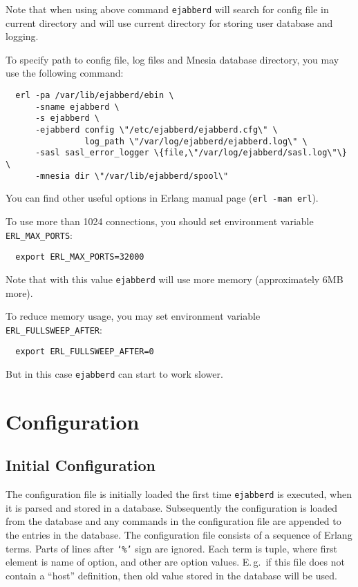 \documentclass[a4paper,10pt]{article}
\newcommand{\term}[1]{\texttt{#1}}
\newcommand{\shell}[1]{\texttt{#1}}
\newcommand{\ejabberd}{\texttt{ejabberd}}
\begin{document}
Note that when using above command \ejabberd{} will search for config file
in current directory and will use current directory for storing user database
and logging.

To specify path to config file, log files and Mnesia database directory,
you may use the following command:
\begin{verbatim}
  erl -pa /var/lib/ejabberd/ebin \
      -sname ejabberd \
      -s ejabberd \
      -ejabberd config \"/etc/ejabberd/ejabberd.cfg\" \
                log_path \"/var/log/ejabberd/ejabberd.log\" \
      -sasl sasl_error_logger \{file,\"/var/log/ejabberd/sasl.log\"\} \
      -mnesia dir \"/var/lib/ejabberd/spool\"
\end{verbatim}

You can find other useful options in Erlang manual page (\shell{erl -man erl}).

To use more than 1024 connections, you should set environment variable
\verb|ERL_MAX_PORTS|:
\begin{verbatim}
  export ERL_MAX_PORTS=32000
\end{verbatim}
Note that with this value \ejabberd{} will use more memory (approximately 6MB
more).

To reduce memory usage, you may set environment variable
\verb|ERL_FULLSWEEP_AFTER|:
\begin{verbatim}
  export ERL_FULLSWEEP_AFTER=0
\end{verbatim}
But in this case \ejabberd{} can start to work slower.


\section{Configuration}
\label{sec:configuration}

\subsection{Initial Configuration}
\label{sec:initconfig}

The configuration file is initially loaded the first time \ejabberd{} is
executed, when it is parsed and stored in a database.  Subsequently the
configuration is loaded from the database and any commands in the configuration
file are appended to the entries in the database.  The configuration file
consists of a sequence of Erlang terms. Parts of lines after \term{`\%'} sign
are ignored.  Each term is tuple, where first element is name of option, and
other are option values. E.\,g.\ if this file does not contain a ``host''
definition, then old value stored in the database will be used.
\end{document}
